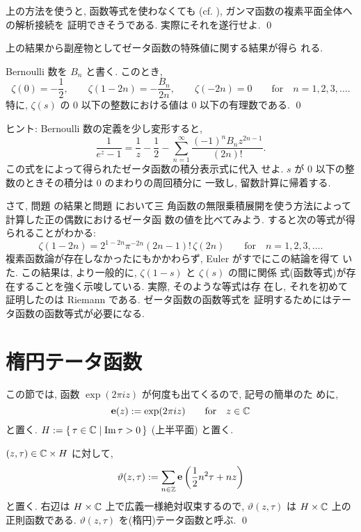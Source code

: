 \documentclass[12pt,twoside]{jarticle}
\begin{document}
\begin{question}
  上の方法を使うと, 函数等式を使わなくても %
  (cf. ), ガンマ函数の複素平面全体への解析接続を
  証明できそうである. 実際にそれを遂行せよ.
  \qed
\end{question}

\noindent 上の結果から副産物としてゼータ函数の特殊値に関する結果が得ら
れる.

\begin{question}\label{q:Zeta-spval1}\qstar{*}
  Bernoulli 数を $B_n$ と書く. このとき,  
  \[
    \zeta(0) = - \frac{1}{2},
    \qquad
    \zeta(1-2n) = - \frac{B_n}{2n},
    \qquad
    \zeta(-2n) = 0
    \qquad\mbox{for}\quad  n = 1,2,3,\dots.
  \]%
  特に, $\zeta(s)$ の $0$ 以下の整数における値は $0$ 以下の有理数である.
  \qed
\end{question}

\noindent ヒント: Bernoulli 数の定義を少し変形すると,
\[
  \frac{1}{e^z - 1}
  = \frac{1}{z} - \frac{1}{2}
    - \sum_{n=1}^\infty \frac{(-1)^n B_n z^{2n-1}}{(2n)!}.
\]%
この式をによって得られたゼータ函数の積分表示式に代入
せよ.  $s$ が $0$ 以下の整数のときその積分は $0$ のまわりの周回積分に
一致し, 留数計算に帰着する.

さて, 問題  の結果と問題 において三
角函数の無限乗積展開を使う方法によって計算した正の偶数におけるゼータ函
数の値を比べてみよう. すると次の等式が得られることがわかる:
\[
  \zeta(1 - 2n) = 2^{1 - 2n} \pi^{-2n} (2n-1)!\, \zeta(2n)
  \qquad\mbox{for}\quad
  n = 1,2,3,\dots.
\]%
複素函数論が存在しなかったにもかかわらず, Euler がすでにこの結論を得て
いた. この結果は, より一般的に, $\zeta(1-s)$ と $\zeta(s)$ の間に関係
式(函数等式)が存在することを強く示唆している. 実際, そのような等式は存
在し, それを初めて証明したのは Riemann である. ゼータ函数の函数等式を
証明するためにはテータ函数の函数等式が必要になる.



\section{楕円テータ函数}

この節では, 函数 $\exp(2\pi iz)$ が何度も出てくるので, 記号の簡単のた
めに,
\[
  \mathop{\mathbf{e}}\nolimits(z) := \exp(2\pi iz)
  \qquad\text{for}\quad z\in{\mathbb C}
\]%
と置く. $H := \{\, \tau \in {\mathbb C} \mid \mathop{\mathrm{Im}}\nolimits \tau > 0 \,\}$ (上半平面)
と置く.

\begin{question}[定義]
  $(z,\tau)\in{\mathbb C}\times H$ に対して,
  \[
    \vartheta(z,\tau)
    := \sum_{n\in{\mathbb Z}} \mathop{\mathbf{e}}\nolimits\left( \frac{1}{2}n^2\tau + nz \right)
  \]%
  と置く. 右辺は $H\times{\mathbb C}$ 上で広義一様絶対収束するので,
  $\vartheta(z,\tau)$ は $H\times{\mathbb C}$ 上の正則函数である. 
  $\vartheta(z,\tau)$ を(楕円)テータ函数と呼ぶ.
  \qed
\end{question}
\end{document}
